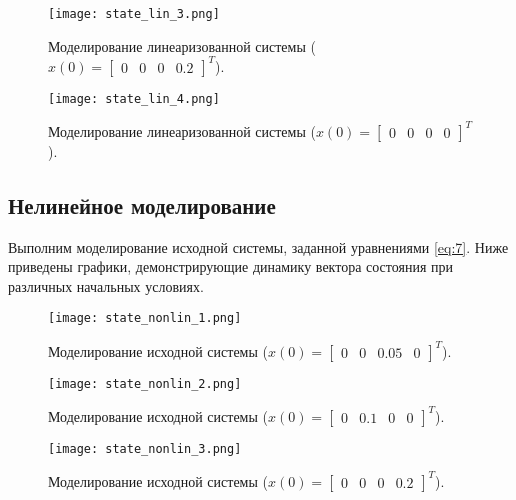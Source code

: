 \begin{figure}[]
    \centering
    \texttt{[image: state\_lin\_3.png]}
    \caption{\label{fig:task2_3_3}Моделирование линеаризованной системы ($x(0)=\begin{bmatrix}
        0 & 0 & 0 & 0.2
    \end{bmatrix}^T$).}
\end{figure}

\begin{figure}[]
    \centering
    \texttt{[image: state\_lin\_4.png]}
    \caption{\label{fig:task2_3_4}Моделирование линеаризованной системы ($x(0)=\begin{bmatrix}
        0 & 0 & 0 & 0
    \end{bmatrix}^T$).}
\end{figure}

\subsection{Нелинейное моделирование}
Выполним моделирование исходной системы, заданной уравнениями \ref{eq:7}.
Ниже приведены графики, демонстрирующие динамику вектора состояния при различных начальных условиях.

\begin{figure}[h]
    \centering
    \texttt{[image: state\_nonlin\_1.png]}
    \caption{\label{fig:task2_4_1}Моделирование исходной системы ($x(0)=\begin{bmatrix}
        0 & 0 & 0.05 & 0
    \end{bmatrix}^T$).}
\end{figure}

\begin{figure}[]
    \centering
    \texttt{[image: state\_nonlin\_2.png]}
    \caption{\label{fig:task2_4_2}Моделирование исходной системы ($x(0)=\begin{bmatrix}
        0 & 0.1 & 0 & 0
    \end{bmatrix}^T$).}
\end{figure}

\begin{figure}[]
    \centering
    \texttt{[image: state\_nonlin\_3.png]}
    \caption{\label{fig:task2_4_3}Моделирование исходной системы ($x(0)=\begin{bmatrix}
        0 & 0 & 0 & 0.2
    \end{bmatrix}^T$).}
\end{figure}

